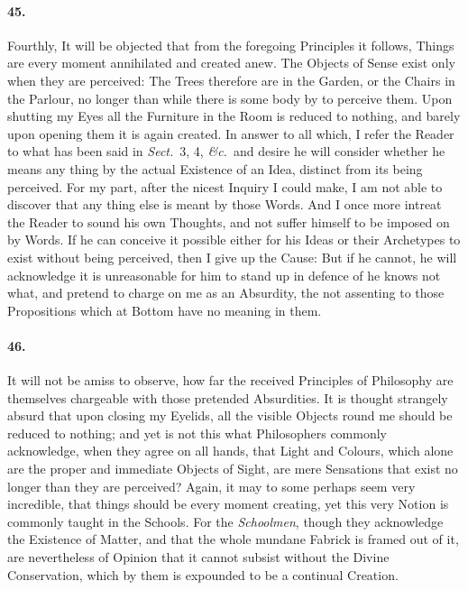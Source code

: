 \documentclass[]{article}
\newenvironment{sectionbody}{}{}
\begin{document}
\begin{sectionbody}
\paragraph{45.} Fourthly, It will be objected that from the foregoing Principles
it follows, Things are every moment annihilated and created anew.
The Objects of Sense exist only when they are perceived: The
Trees therefore are in the Garden, or the Chairs in the Parlour,
no longer than while there is some body by to perceive them.
Upon shutting my Eyes all the Furniture in the Room is reduced to
nothing, and barely upon opening them it is again created.  In
answer to all which, I refer the Reader to what has been said in
\emph{Sect.}\ 3, 4, \emph{\&c.}\ and desire he will consider
whether he means any thing by the
actual Existence of an Idea, distinct from its being perceived.
For my part, after the nicest Inquiry I could make, I am not able
to discover that any thing else is meant by those Words.  And I
once more intreat the Reader to sound his own Thoughts, and not
suffer himself to be imposed on by Words.  If he can conceive it
possible either for his Ideas or their Archetypes to exist
without being perceived, then I give up the Cause: But if he
cannot, he will acknowledge it is unreasonable for him to stand
up in defence of he knows not what, and pretend to charge on me
as an Absurdity, the not assenting to those Propositions which at
Bottom have no meaning in them.



\paragraph{46.} It will not be amiss to observe, how far the received Principles
of Philosophy are themselves chargeable with those pretended
Absurdities.  It is thought strangely absurd that upon closing my
Eyelids, all the visible Objects round me should be reduced to
nothing; and yet is not this what Philosophers commonly
acknowledge, when they agree on all hands, that Light and
Colours, which alone are the proper and immediate Objects of
Sight, are mere Sensations that exist no longer than they are
perceived?  Again, it may to some perhaps seem very incredible,
that things should be every moment creating, yet this very Notion
is commonly taught in the Schools.  For the \emph{Schoolmen},
though they acknowledge the Existence of Matter, and that the
whole mundane Fabrick is framed out of it, are nevertheless of
Opinion that it cannot subsist without the Divine Conservation,
which by them is expounded to be a continual Creation.




\end{sectionbody}
\end{document}
